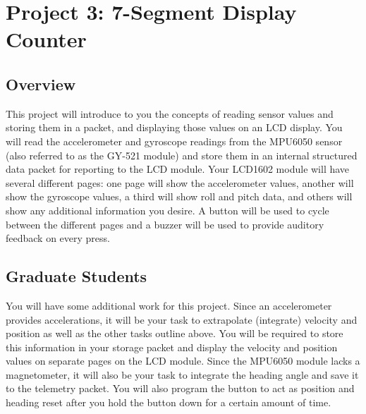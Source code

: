 %

\chapter{Project 3: 7-Segment Display Counter}

\section*{Overview} 
This project will introduce to you the concepts of reading sensor values and storing them in a packet, and displaying those values on an LCD display. 
You will read the accelerometer and gyroscope readings from the MPU6050 sensor (also referred to as the GY-521 module) and store them in an internal structured data packet for reporting to the LCD module.
Your LCD1602 module will have several different pages: one page will show the accelerometer values, another will show the gyroscope values, a third will show roll and pitch data, and others will show any additional information you desire.
A button will be used to cycle between the different pages and a buzzer will be used to provide auditory feedback on every press.

\section*{Graduate Students} 
You will have some additional work for this project. 
Since an accelerometer provides accelerations, it will be your task to extrapolate (integrate) velocity and position as well as the other tasks outline above.
You will be required to store this information in your storage packet and display the velocity and position values on separate pages on the LCD module.
Since the MPU6050 module lacks a magnetometer, it will also be your task to integrate the heading angle and save it to the telemetry packet.
You will also program the button to act as position and heading reset after you hold the button down for a certain amount of time.


